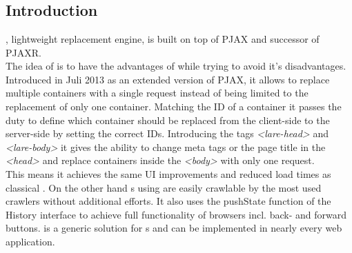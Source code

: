 \section{\lare{}\label{chap:lare}}
\subsection{Introduction\label{sec:lare_introduction}}
\lare{}, lightweight \ajax{} replacement engine, is built on top of PJAX and successor of PJAXR.
\\
The idea of \lare{} is to have the advantages of \ajax{} while trying to avoid it's disadvantages.
Introduced in Juli 2013 as an extended version of PJAX, it allows to replace multiple containers with a single request instead of being limited to the replacement of only one container.
Matching the ID of a container it passes the duty to define which container should be replaced from the client-side to the server-side by setting the correct IDs.
Introducing the tags \emph{<lare-head>} and \emph{<lare-body>} it gives the ability to change meta tags or the page title in the \emph{<head>} and replace containers inside the \emph{<body>} with only one request.
\\
This means it achieves the same UI improvements and reduced load times as classical \ajax{}.
On the other hand \singlePageApplication{}s using \lare{} are easily crawlable by the most used crawlers without additional efforts.
It also uses the pushState function of the History interface to achieve full functionality of browsers incl. back- and forward buttons.
\lare{} is a generic solution for \singlePageApplication{}s and can be implemented in nearly every web application.

